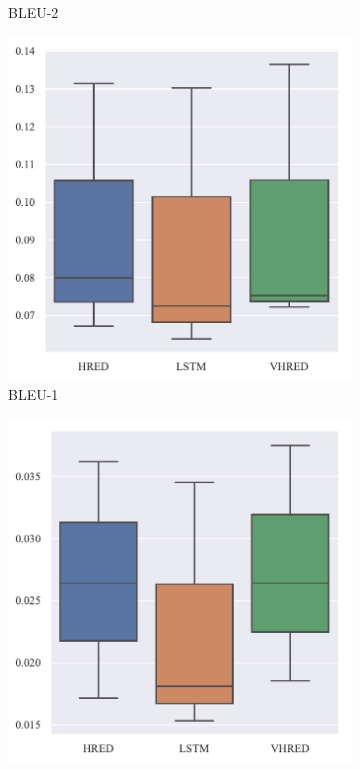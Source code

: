\begin{figure}[H]
\begin{subfigure}{0.24\linewidth}
        \caption{BLEU-2}
    \end{subfigure}%
    \begin{subfigure}{0.24\linewidth}
        \centering
        \includegraphics[width=\linewidth]{figure/boxplot/model/bleu_1/plot.pdf}
        \caption{BLEU-1}
    \end{subfigure}%
    \begin{subfigure}{0.24\linewidth}
        \centering
        \includegraphics[width=\linewidth]{figure/boxplot/model/bleu_2/plot.pdf}

\end{subfigure}
\end{figure}

